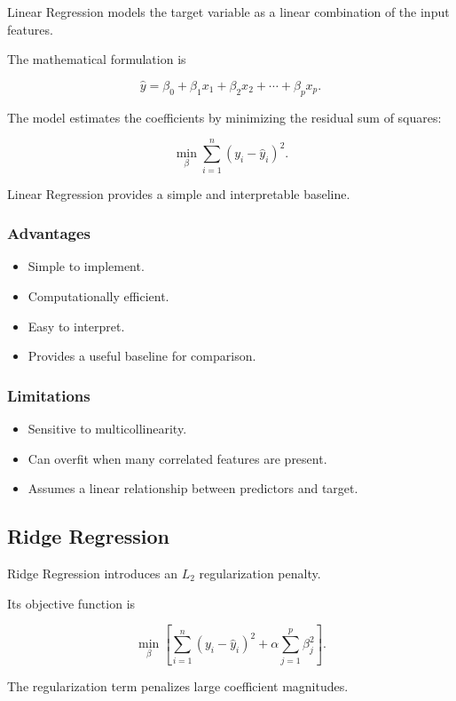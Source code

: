 \documentclass[12pt,a4paper]{article}
\begin{document}
Linear Regression models the target variable as a linear combination of
the input features.

The mathematical formulation is

\[
\hat{y} = \beta_0 + \beta_1x_1+\beta_2x_2+\cdots+\beta_px_p.
\]

The model estimates the coefficients by minimizing the residual sum of
squares:

\[
\min_{\beta}
\sum_{i=1}^{n}
(y_i-\hat{y}_i)^2.
\]

Linear Regression provides a simple and interpretable baseline.

\subsubsection{Advantages}

\begin{itemize}
    \item Simple to implement.
    \item Computationally efficient.
    \item Easy to interpret.
    \item Provides a useful baseline for comparison.
\end{itemize}

\subsubsection{Limitations}

\begin{itemize}
    \item Sensitive to multicollinearity.
    \item Can overfit when many correlated features are present.
    \item Assumes a linear relationship between predictors and target.
\end{itemize}

\subsection{Ridge Regression}

Ridge Regression introduces an $L_2$ regularization penalty.

Its objective function is

\[
\min_{\beta}
\left[
\sum_{i=1}^{n}
(y_i-\hat{y}_i)^2
+
\alpha\sum_{j=1}^{p}\beta_j^2
\right].
\]

The regularization term penalizes large coefficient magnitudes.
\end{document}
